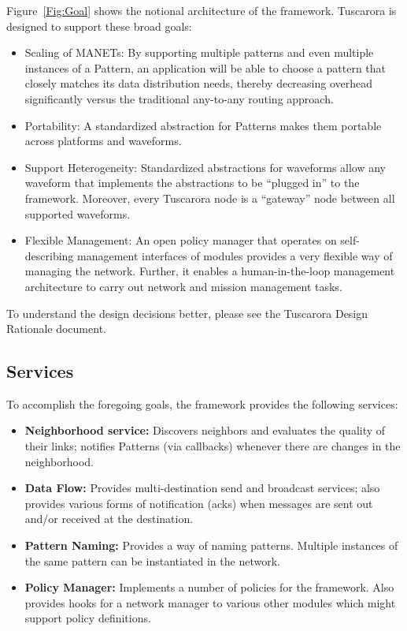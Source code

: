 Figure~\ref{Fig:Goal} shows the notional architecture of the
framework. Tuscarora is designed to support these broad goals:  
\begin{itemize}
 \item Scaling of MANETs: By supporting multiple patterns and even
   multiple instances of a Pattern, an application will be able to
   choose a pattern that closely matches its data distribution needs,
   thereby decreasing overhead significantly versus the traditional
   any-to-any routing approach.

 \item Portability: A standardized abstraction for Patterns makes them
   portable across platforms and waveforms.

 \item Support Heterogeneity: Standardized abstractions for waveforms
   allow any waveform that implements the abstractions to be ``plugged
   in'' to the framework.  Moreover, every Tuscarora node is a ``gateway''
   node between all supported waveforms.

 \item Flexible Management: An open policy manager that operates on
   self-describing management interfaces of modules provides a very
   flexible way of managing the network.  Further, it enables a
   human-in-the-loop management architecture to carry out network and
   mission management tasks.
\end{itemize}

To understand the design decisions better, please see the Tuscarora
Design Rationale document.

\subsection{Services}
\label{Subsec:Services}

To accomplish the foregoing goals, the framework provides the following services:
\begin{itemize}
 \item \textbf{Neighborhood service:} Discovers neighbors and evaluates the
   quality of their links; notifies Patterns (via callbacks)
   whenever there are changes in the neighborhood.

 \item \textbf{Data Flow:} Provides multi-destination send and broadcast
   services; also provides various forms of notification (acks) when messages
   are sent out and/or received at the destination.

 \item \textbf{Pattern Naming:} Provides a way of naming patterns. Multiple
   instances of the same pattern can be instantiated in the network.

 \item\textbf{ Policy Manager:} Implements a number of policies for the framework. Also provides hooks for a network manager to various other modules which might support policy definitions.
\end{itemize}


